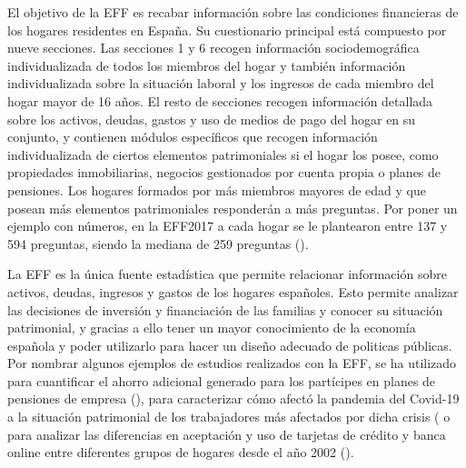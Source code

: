 El objetivo de la EFF es recabar información sobre las condiciones financieras de los hogares residentes en España. Su cuestionario principal está compuesto por nueve secciones. Las secciones 1 y 6 recogen información sociodemográfica individualizada de todos los miembros del hogar y también información individualizada sobre la situación laboral y los ingresos de cada miembro del hogar mayor de 16 años. El resto de secciones recogen información detallada sobre los activos, deudas, gastos y uso de medios de pago del hogar en su conjunto, y contienen módulos específicos que recogen información individualizada de ciertos elementos patrimoniales si el hogar los posee, como propiedades inmobiliarias, negocios gestionados por cuenta propia o planes de pensiones. Los hogares formados por más miembros mayores de edad y que posean más elementos patrimoniales responderán a más preguntas. Por poner un ejemplo con números, en la EFF2017 a cada hogar se le plantearon entre 137 y 594 preguntas, siendo la mediana de 259 preguntas (\cite{effmethod2017}).

La EFF es la única fuente estadística que permite relacionar información sobre activos, deudas, ingresos y gastos de los hogares españoles. Esto permite analizar las decisiones de inversión y financiación de las familias y conocer su situación patrimonial, y gracias a ello tener un mayor conocimiento de la economía española y poder utilizarlo para hacer un diseño adecuado de politicas públicas. Por nombrar algunos ejemplos de estudios realizados con la EFF, se ha utilizado para cuantificar el ahorro adicional generado para los partícipes en planes de pensiones de empresa (\cite{gomez2022pensiones}), para caracterizar cómo afectó la pandemia del Covid-19 a la situación patrimonial de los trabajadores más afectados por dicha crisis (\cite{alvargonzalez2020pandemia} o para analizar las diferencias en aceptación y uso de tarjetas de crédito y banca online entre diferentes grupos de hogares desde el año 2002 (\cite{crespo2023bancaonline}).

